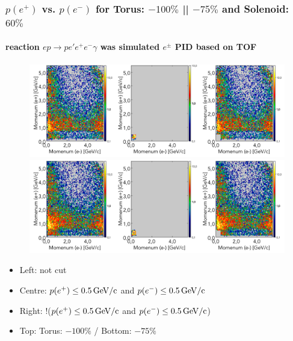 \documentclass[xcolor=table, xcolor=dvipsnames]{beamer}
\begin{document}
      
      \begin{frame}
        \frametitle{$p(e^+)$ vs. $p(e^-)$ for Torus: $-100\%$ || $-75\%$ and Solenoid: $60\%$}
        \framesubtitle{reaction $ep\to p e' e^+ e^- \gamma$ was simulated $e^\pm$ PID based on TOF }
        \footnotesize
        \begin{figure}
          \includegraphics[width=1.0\textwidth,height=0.2\textwidth]{triggerStudies_Tor1_cut05_pEP_vs_pEM.png}\\
           \includegraphics[width=1.0\textwidth,height=0.2\textwidth]{triggerStudies_Tor075_cut05_pEP_vs_pEM.png}
        \end{figure}
        
        \begin{itemize}
          \item Left: not cut 
          \item Centre: $p(e^+) \le 0.5\,\rm{GeV/c}$ and $p(e^-) \le 0.5\,\rm{GeV/c}$ 
          \item  Right: !($p(e^+) \le 0.5\,\rm{GeV/c}$ and $p(e^-) \le 0.5\,\rm{GeV/c}$)
          \item Top: Torus: $-100\%$ / Bottom: $-75\%$
        \end{itemize}
\end{frame}
\end{document}
